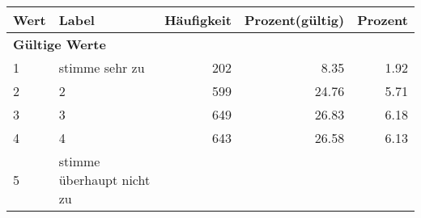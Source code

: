      \begin{longtable}{lXrrr}
     \toprule
     \textbf{Wert} & \textbf{Label} & \textbf{Häufigkeit} & \textbf{Prozent(gültig)} & \textbf{Prozent} \\
     \endhead
     \midrule
     \multicolumn{5}{l}{\textbf{Gültige Werte}}\\

     1 &
     \multicolumn{1}{X}{ stimme sehr zu   } &


       \num{202} &
       \num[round-mode=places,round-precision=2]{8.35} &
         \num[round-mode=places,round-precision=2]{1.92} \\

     2 &
     \multicolumn{1}{X}{ 2   } &


       \num{599} &
       \num[round-mode=places,round-precision=2]{24.76} &
         \num[round-mode=places,round-precision=2]{5.71} \\

     3 &
     \multicolumn{1}{X}{ 3   } &


       \num{649} &
       \num[round-mode=places,round-precision=2]{26.83} &
         \num[round-mode=places,round-precision=2]{6.18} \\

     4 &
     \multicolumn{1}{X}{ 4   } &


       \num{643} &
       \num[round-mode=places,round-precision=2]{26.58} &
         \num[round-mode=places,round-precision=2]{6.13} \\

     5 &
     \multicolumn{1}{X}{ stimme überhaupt nicht zu   } &



\end{longtable}
